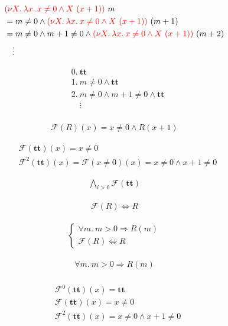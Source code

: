 \documentclass{jarticle}
\theoremstyle{definition}
\newcommand \true {\textbf{tt}}
\newcommand {\pdrtransform} {\mathcal{F}}
\newcommand {\pdrF} {\pdrtransform}
\begin{document}
\begin{align*}
  &{ \color{red} (\nu X.\: \lambda x.\: x \neq 0 \wedge X\ (x + 1))} \ m \\
  &= m \neq 0 \wedge { \color{red} (\nu X.\: \lambda x.\: x \neq 0 \wedge X\
          (x + 1))}\ (m + 1)
    \\
  &= m \neq 0 \wedge m +1 \neq 0 \wedge {\color{red}(\nu X.\: \lambda x.\: x \neq 0 \wedge
          X\ (x + 1))}\ (m + 2) \\
  &\quad \vdots \\
\end{align*}

\begin{align*}
  &0.\: \true \\
  &1.\: m \neq 0 \wedge \true \\
  &2.\: m \neq 0 \wedge m +1 \neq 0 \wedge \true \\
  &\quad \vdots \\
\end{align*}

\begin{align*}
    \pdrF(R)(x) = x \neq 0 \wedge R(x+1)
\end{align*}

\begin{align*}
    &\pdrF(\true)(x) = x \neq 0 \\
    &\pdrF^2(\true)(x) = \pdrF(x\neq0)(x) = x \neq 0 \wedge x + 1 \neq 0
\end{align*}

\begin{align*}
    \bigwedge_{i > 0} \pdrF(\true)
\end{align*}

\begin{align*}
    \pdrF(R) \Leftrightarrow R
\end{align*}

\begin{align*}
    \begin{cases}
        \forall m.\: m > 0 \Rightarrow R(m) \\
        \pdrF(R) \Leftrightarrow R
    \end{cases}
\end{align*}

\begin{align*}
    \forall m.\: m > 0 \Rightarrow R(m) \\
\end{align*}

\begin{align*}
    &\pdrF^0(\true)(x) = \true \\
    &\pdrF(\true)(x) = x \neq 0 \\
    &\pdrF^2(\true)(x) = x \neq 0 \wedge x + 1 \neq 0
\end{align*}
\end{document}
